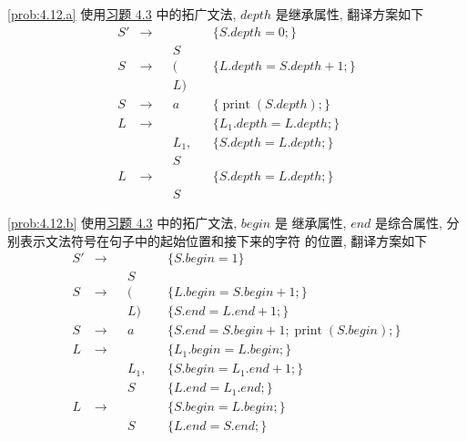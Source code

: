 \documentclass[boxes]{homework}
\begin{document}
\begin{solution}
    \ref{prob:4.12.a} 使用\hyperref[prob:4.3]{习题 4.3} 中的拓广文法, $depth$
    是继承属性, 翻译方案如下
    \begin{equation}
        \begin{aligned}
            S' & \to &  &        &  & \{S.depth = 0;\}                    \\
               &     &  & S                                               \\
            S  & \to &  & (      &  & \{L.depth = S.depth + 1;\}          \\
               &     &  & L)                                              \\
            S  & \to &  & a      &  & \{\operatorname{print} (S.depth);\} \\
            L  & \to &  &        &  & \{L_{1}.depth = L.depth;\}          \\
               &     &  & L_{1}, &  & \{ S.depth = L.depth;\}             \\
               &     &  & S                                               \\
            L  & \to &  &        &  & \{S.depth = L.depth;\}              \\
               &     &  & S
        \end{aligned}
    \end{equation}

    \ref{prob:4.12.b} 使用\hyperref[prob:4.3]{习题 4.3} 中的拓广文法, $begin$ 是
    继承属性, $end$ 是综合属性, 分别表示文法符号在句子中的起始位置和接下来的字符
    的位置, 翻译方案如下
    \begin{equation}
        \begin{aligned}
            S' & \to &  &        &  & \{S.begin = 1\}                                          \\
               &     &  & S                                                                    \\
            S  & \to &  & (      &  & \{L.begin = S.begin + 1;\}                               \\
               &     &  & L)     &  & \{S.end = L.end + 1;\}                                   \\
            S  & \to &  & a      &  & \{S.end = S.begin + 1; \operatorname{print} (S.begin);\} \\
            L  & \to &  &        &  & \{L_{1}.begin = L.begin;\}                               \\
               &     &  & L_{1}, &  & \{S.begin = L_{1}.end + 1;\}                             \\
               &     &  & S      &  & \{L.end = L_{1}.end;\}                                   \\
            L  & \to &  &        &  & \{S.begin = L.begin;\}                                   \\
               &     &  & S      &  & \{L.end = S.end;\}
        \end{aligned}
    \end{equation}

\end{solution}
\end{document}
